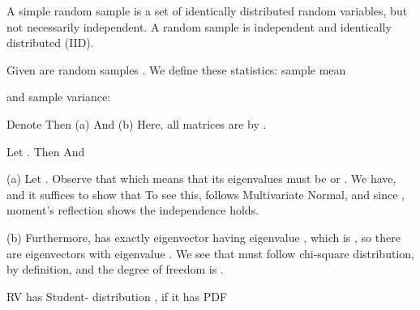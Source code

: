 

A simple random sample is a set of identically distributed random variables, but not necessarily independent.
A random sample is independent and identically distributed (IID).

Given are random samples .
We define these statistics: sample mean

and sample variance:

Denote
Then (a)
And (b)
Here, all matrices are  by .

Let .
Then
And


 (a)
Let .
Observe that
which means that its eigenvalues must be  or .
We have,
and it suffices to show that
To see this,  follows Multivariate Normal, and since , moment's reflection shows the independence holds.

(b) Furthermore,  has exactly  eigenvector having eigenvalue , which is , so there are  eigenvectors with eigenvalue .
We see that  must follow chi-square distribution, by definition, and the degree of freedom is .

RV  has Student- distribution , if it has PDF

